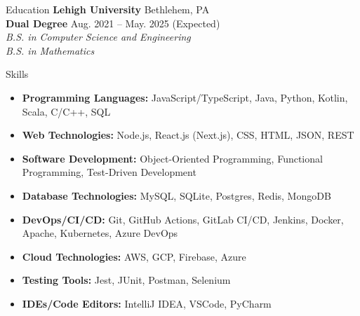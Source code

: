 \documentclass{resume}
\begin{document}
\begin{rSection}{Education}
{\bf Lehigh University} \hfill { Bethlehem, PA } \\
{\bf Dual Degree} \hfill {Aug. 2021 – May. 2025 (Expected)} \\
{\emph{B.S. in Computer Science and Engineering}} \\
{\emph{B.S. in Mathematics}}
\end{rSection}

\begin{rSection}{Skills}
    \begin{itemize}
        \itemsep -5pt {} 
        \item \textbf{Programming Languages:} JavaScript/TypeScript, Java, Python, Kotlin, Scala, C/C++, SQL
        \item \textbf{Web Technologies:} Node.js, React.js (Next.js), CSS, HTML, JSON, REST
        \item \textbf{Software Development:} Object-Oriented Programming, Functional Programming, Test-Driven Development
        \item \textbf{Database Technologies:} MySQL, SQLite, Postgres, Redis, MongoDB
        \item \textbf{DevOps/CI/CD:} Git, GitHub Actions, GitLab CI/CD, Jenkins, Docker, Apache, Kubernetes, Azure DevOps
        \item \textbf{Cloud Technologies:} AWS, GCP, Firebase, Azure
        \item \textbf{Testing Tools:} Jest, JUnit, Postman, Selenium
        \item \textbf{IDEs/Code Editors:} IntelliJ IDEA, VSCode, PyCharm
    \end{itemize}
\end{rSection}
\end{document}
